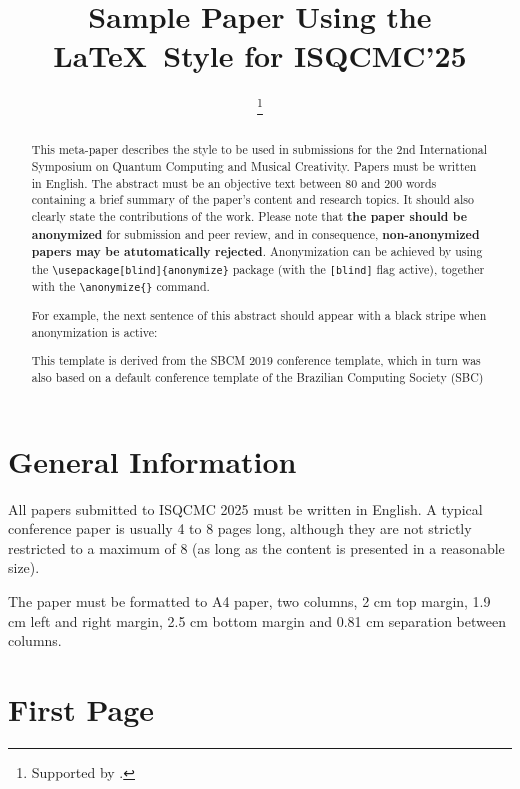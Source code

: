 \documentclass[10pt,twocolumn]{article}
\title{Sample Paper Using the \LaTeX\ Style for ISQCMC'25}
\author{\anonymize{First Author }\inst{1}\thanks{Supported by \anonymize{[[Sponsor]]}.} \and
        \anonymize{Second Author}\inst{1}\inst{2}}
\begin{document}
\maketitle

\begin{abstract}
This meta-paper describes the style to be used in submissions for the 2nd International Symposium on Quantum Computing and Musical Creativity. Papers must be written in English. The abstract must be an objective text between 80 and 200 words containing a brief summary of the paper's content and research topics. It should also clearly state the contributions of the work.
Please note that \textbf{the paper should be anonymized} for submission and peer review, and in consequence, \textbf{non-anonymized papers may be atutomatically rejected}. Anonymization can be achieved by using the \lstinline[breaklines=true]!\usepackage[blind]{anonymize}! package (with the \texttt{[blind]} flag active), together with the \lstinline[breaklines=true]!\anonymize{}! command.

For example, the next sentence of this abstract should appear with a black stripe when anonymization is active: 

This template is derived from the SBCM 2019 conference template, which in turn was also based on a default conference template of the Brazilian Computing Society (SBC)

\end{abstract}


\section{General Information}\label{sec:gen}

All papers submitted to ISQCMC 2025 must be written in English. A typical conference paper is usually 4 to 8 pages long, although they are not strictly restricted to a maximum of 8 (as long as the content is presented in a reasonable size). 

The paper must be formatted to A4 paper, two columns, 2 cm top margin, 1.9 cm left and right
margin, 2.5 cm bottom margin and 0.81 cm separation between columns. 



\section{First Page}
\end{document}

